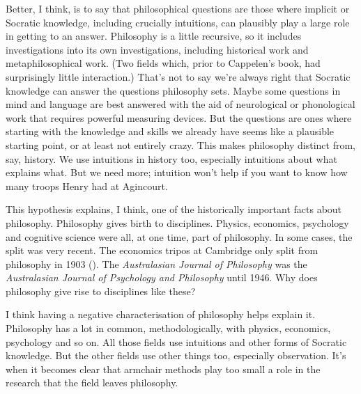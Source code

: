 \documentclass[
  11pt,
  letterpaper,
  DIV=11,
  numbers=noendperiod,
  twoside]{scrartcl}
\begin{document}
Better, I think, is to say that philosophical questions are those where
implicit or Socratic knowledge, including crucially intuitions, can
plausibly play a large role in getting to an answer. Philosophy is a
little recursive, so it includes investigations into its own
investigations, including historical work and metaphilosophical work.
(Two fields which, prior to Cappelen's book, had surprisingly little
interaction.) That's not to say we're always right that Socratic
knowledge can answer the questions philosophy sets. Maybe some questions
in mind and language are best answered with the aid of neurological or
phonological work that requires powerful measuring devices. But the
questions are ones where starting with the knowledge and skills we
already have seems like a plausible starting point, or at least not
entirely crazy. This makes philosophy distinct from, say, history. We
use intuitions in history too, especially intuitions about what explains
what. But we need more; intuition won't help if you want to know how
many troops Henry had at Agincourt.

This hypothesis explains, I think, one of the historically important
facts about philosophy. Philosophy gives birth to disciplines. Physics,
economics, psychology and cognitive science were all, at one time, part
of philosophy. In some cases, the split was very recent. The economics
tripos at Cambridge only split from philosophy in 1903
(). The \emph{Australasian Journal
of Philosophy} was the \emph{Australasian Journal of Psychology and
Philosophy} until 1946. Why does philosophy give rise to disciplines
like these?

I think having a negative characterisation of philosophy helps explain
it. Philosophy has a lot in common, methodologically, with physics,
economics, psychology and so on. All those fields use intuitions and
other forms of Socratic knowledge. But the other fields use other things
too, especially observation. It's when it becomes clear that armchair
methods play too small a role in the research that the field leaves
philosophy.
\end{document}
